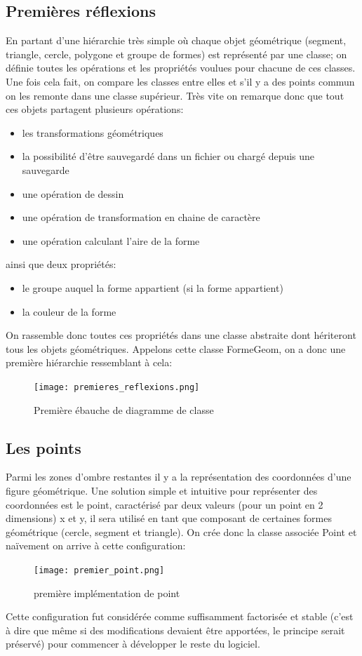 \documentclass[10pt,a4paper]{report}
\begin{document}
\begin{spacing}{0.8}
\subsection{Premières réflexions}
En partant d'une hiérarchie très simple où chaque objet géométrique (segment, triangle, cercle, polygone et groupe de formes) est représenté par une classe; on définie toutes les opérations et les propriétés voulues pour chacune de ces classes. Une fois cela fait, on compare les classes entre elles et s'il y a des points commun on les remonte dans une classe supérieur. Très vite on remarque donc que tout ces objets partagent plusieurs opérations:
\begin{itemize}
\item les transformations géométriques
\item la possibilité d'être sauvegardé dans un fichier ou chargé depuis une sauvegarde
\item une opération de dessin
\item une opération de transformation en chaine de caractère
\item une opération calculant l'aire de la forme
\end{itemize} 
ainsi que deux propriétés:
\begin{itemize}
\item le groupe auquel la forme appartient (si la forme appartient)
\item la couleur de la forme
\end{itemize}
On rassemble donc toutes ces propriétés dans une classe abstraite dont hériteront tous les objets géométriques. Appelons cette classe FormeGeom, on a donc une première hiérarchie ressemblant à cela:
\begin{figure}[H]
\texttt{[image: premieres\_reflexions.png]}
\caption{Première ébauche de diagramme de classe}
\end{figure}


\subsection{Les points}
Parmi les zones d'ombre restantes il y a la représentation des coordonnées d'une figure géométrique. Une solution simple et intuitive pour représenter des coordonnées est le point, caractérisé par deux valeurs (pour un point en 2 dimensions) x et y, il sera utilisé en tant que composant de certaines formes géométrique (cercle, segment et triangle). On crée donc la classe associée Point et naïvement on arrive à cette configuration:
\begin{figure}[H]
\texttt{[image: premier\_point.png]}
\caption{première implémentation de point}
\end{figure}
Cette configuration fut considérée comme suffisamment factorisée et stable (c'est à dire que même si des modifications devaient être apportées, le principe serait préservé) pour commencer à développer le reste du logiciel.



\end{spacing}
\end{document}
